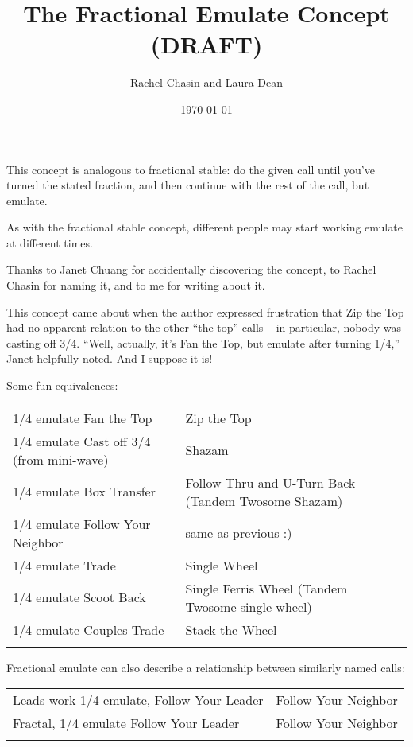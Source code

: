 \documentclass[11pt]{article}
\title{The Fractional Emulate Concept (DRAFT)}
\author{Rachel Chasin and Laura Dean}
\date{\today}
\begin{document}
\thispagestyle{empty}
\maketitle


This concept is analogous to fractional stable:
do the given call until you've turned the stated fraction,
and then continue with the rest of the call, but emulate.

As with the fractional stable concept, different people may start
working emulate at different times.

Thanks to Janet Chuang for accidentally discovering the concept,
to Rachel Chasin for naming it, and to me for writing about it.

This concept came about when the author expressed frustration that Zip
the Top had no apparent relation to the other ``the top'' calls -- in
particular, nobody was casting off 3/4. 
``Well, actually, it's Fan the Top, but emulate after turning 1/4,''
Janet helpfully noted.  And I suppose it is!

Some fun equivalences:

\begin{tabular}{ll}
\hline
1/4 emulate Fan the Top   & Zip the Top \\
1/4 emulate Cast off 3/4 (from mini-wave)  & Shazam \\
1/4 emulate Box Transfer & Follow Thru and U-Turn Back (Tandem Twosome Shazam) \\
1/4 emulate Follow Your Neighbor  & same as previous :) \\
1/4 emulate Trade                          & Single Wheel \\
1/4 emulate Scoot Back  & Single Ferris Wheel (Tandem Twosome single wheel)\\
1/4 emulate Couples Trade  & Stack the Wheel \\
\hline \\
\end{tabular}

Fractional emulate can also describe a relationship between similarly named calls:

\begin{tabular}{ll}
\hline
Leads work 1/4 emulate, Follow Your Leader & Follow Your Neighbor \\
Fractal, 1/4 emulate Follow Your Leader    & Follow Your Neighbor \\
\hline \\
\end{tabular}
\end{document}
